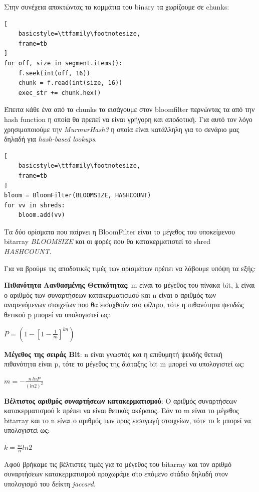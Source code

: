 Στην συνέχεια αποκτώντας τα κομμάτια του binary τα χωρίζουμε σε chunks:
\begin{lstlisting}[
    basicstyle=\ttfamily\footnotesize,
    frame=tb
]
for off, size in segment.items():
    f.seek(int(off, 16))
    chunk = f.read(int(size, 16))
    exec_str += chunk.hex()
\end{lstlisting}

Έπειτα κάθε ένα από τα chunks τα εισάγουμε στον bloomfilter περνώντας τα από την hash function η οποία θα πρεπεί να είναι γρήγορη και αποδοτική.
Για αυτό τον λόγο χρησιμοποιούμε την \emph{MurmurHash3} η οποία είναι κατάλληλη για το σενάριο μας δηλαδή για \emph{hash-based lookups}.

\begin{lstlisting}[
    basicstyle=\ttfamily\footnotesize,
    frame=tb
]
bloom = BloomFilter(BLOOMSIZE, HASHCOUNT)
for vv in shreds:
    bloom.add(vv)
\end{lstlisting}

Τα δύο ορίσματα που παίρνει η BloomFilter είναι το μέγεθος του υποκείμενου bitarray \emph{BLOOMSIZE} και οι φορές που θα κατακερματιστεί το shred \emph{HASHCOUNT}.

Για να βρούμε τις αποδοτικές τιμές των ορισμάτων πρέπει να λάβουμε υπόψη τα εξής:

\textbf{Πιθανότητα Λανθασμένης Θετικότητας}: m είναι το μέγεθος του πίνακα bit, k είναι ο αριθμός των συναρτήσεων κατακερματισμού και n είναι ο αριθμός των αναμενόμενων στοιχείων που θα εισαχθούν στο φίλτρο, τότε η πιθανότητα ψευδώς θετικού p μπορεί να υπολογιστεί ως:

{\large$P=\left ( 1-\left [ 1- \frac {1}{m} \right ]^{kn} \right )$}

\textbf{Μέγεθος της σειράς Bit}:  n είναι γνωστός και η επιθυμητή ψευδής θετική πιθανότητα είναι p, τότε το μέγεθος της διάταξης bit m μπορεί να υπολογιστεί ως:

{\large $m = -\frac {n \ ln P} {(ln 2) ^ 2}$}
 
\textbf{Βέλτιστος αριθμός συναρτήσεων κατακερματισμού}: Ο αριθμός συναρτήσεων κατακερματισμού k πρέπει να είναι θετικός ακέραιος. Εάν το m είναι το μέγεθος bitarray και το n είναι ο αριθμός των προς εισαγωγή στοιχείων, τότε το k μπορεί να υπολογιστεί ως:

{\large $k = \frac {m} {n} ln 2$}

Αφού βρήκαμε τις βέλτιστες τιμές για το μέγεθος του bitarray και τον αριθμό συναρτήσεων κατακερματισμού προχωράμε στο επόμενο στάδιο δηλαδή στον υπολογισμό του δείκτη \emph{jaccard}.

